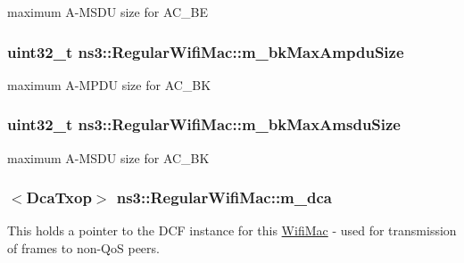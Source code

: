 maximum A-\/\+M\+S\+DU size for A\+C\+\_\+\+BE 

\subsubsection[{\texorpdfstring{m\+\_\+bk\+Max\+Ampdu\+Size}{m_bkMaxAmpduSize}}]{\setlength{\rightskip}{0pt plus 5cm}uint32\+\_\+t ns3\+::\+Regular\+Wifi\+Mac\+::m\+\_\+bk\+Max\+Ampdu\+Size\hspace{0.3cm}{\ttfamily [private]}}\hypertarget{classns3_1_1RegularWifiMac_a17b41d833234be31d9671b34ed9ce959}{}\label{classns3_1_1RegularWifiMac_a17b41d833234be31d9671b34ed9ce959}


maximum A-\/\+M\+P\+DU size for A\+C\+\_\+\+BK 

\subsubsection[{\texorpdfstring{m\+\_\+bk\+Max\+Amsdu\+Size}{m_bkMaxAmsduSize}}]{\setlength{\rightskip}{0pt plus 5cm}uint32\+\_\+t ns3\+::\+Regular\+Wifi\+Mac\+::m\+\_\+bk\+Max\+Amsdu\+Size\hspace{0.3cm}{\ttfamily [private]}}\hypertarget{classns3_1_1RegularWifiMac_a7b2f2e7317dc3945fe5db7fbc43e7d05}{}\label{classns3_1_1RegularWifiMac_a7b2f2e7317dc3945fe5db7fbc43e7d05}


maximum A-\/\+M\+S\+DU size for A\+C\+\_\+\+BK 

\subsubsection[{\texorpdfstring{m\+\_\+dca}{m_dca}}]{$<${\bf Dca\+Txop}$>$ ns3\+::\+Regular\+Wifi\+Mac\+::m\+\_\+dca\hspace{0.3cm}{\ttfamily [protected]}}\hypertarget{classns3_1_1RegularWifiMac_a152965c3def1a308b088b37c2c88a1a2}{}\label{classns3_1_1RegularWifiMac_a152965c3def1a308b088b37c2c88a1a2}
This holds a pointer to the D\+CF instance for this \hyperlink{classns3_1_1WifiMac}{Wifi\+Mac} -\/ used for transmission of frames to non-\/\+QoS peers. 
